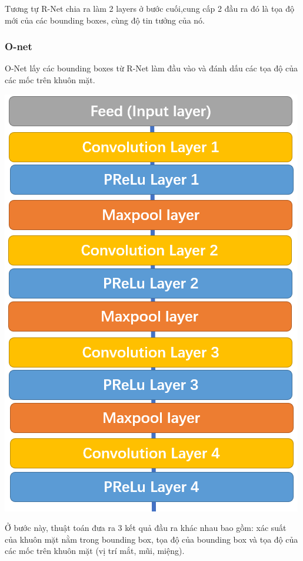 \documentclass[12pt]{extreport}
\begin{document}
Tương tự R-Net chia ra làm 2 layers ở bước cuối,cung cấp 2 đầu ra đó là tọa độ mới của các bounding boxes, cùng độ tin tưởng của nó.

\newpage
\subsubsection{O-net}
O-Net lấy các bounding boxes từ R-Net làm đầu vào và đánh dấu các tọa độ của các mốc trên khuôn mặt.

\begin{center}
\includegraphics[scale=0.5]{Image/MTCNN_O_net}
\end{center}

\newpage

Ở bước này, thuật toán đưa ra 3 kết quả đầu ra khác nhau bao gồm: xác suất của khuôn mặt nằm trong bounding box, tọa độ của bounding box và tọa độ của các mốc trên khuôn mặt (vị trí mắt, mũi, miệng).
\end{document}
